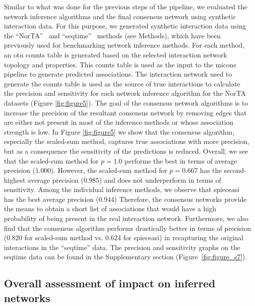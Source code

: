   Similar to what was done for the previous steps of the pipeline, we evaluated the network inference algorithms and the final consensus network using synthetic interaction data.
  For this purpose, we generated synthetic interaction data using the ``NorTA''~\cite{Kurtz2015} and ``seqtime''~\cite{faustSignaturesEcologicalProcesses2018} methods (see Methods), which have been previously used for benchmarking network inference methods.
  For each method, an \ac{otu} counts table is generated based on the selected interaction network topology and properties.
  This counts table is used as the input to the \ac{micone} pipeline to generate predicted associations.
  The interaction network used to generate the counts table is used as the source of true interactions to calculate the precision and sensitivity for each network inference algorithm for the NorTA datasets (Figure \ref{fig:figure5}).
  The goal of the consensus network algorithms is to increase the precision of the resultant consensus network by removing edges that are either not present in most of the inference methods or whose association strength is low.
  In Figure \ref{fig:figure5} we show that the consensus algorithm, especially the scaled-sum method, captures true associations with more precision, but as a consequence the sensitivity of the predictions is reduced.
  Overall, we see that the scaled-sum method for $p=1.0$ performs the best in terms of average precision ($1.000$).
  However, the scaled-sum method for $p=0.667$ has the second-highest average precision ($0.985$) and does not underperform in terms of sensitivity.
  Among the individual inference methods, we observe that \ac{spieceasi} has the best average precision ($0.944$)
  Therefore, the consensus networks provide the means to obtain a short list of associations that would have a high probability of being present in the real interaction network.
  Furthermore, we also find that the consensus algorithm performs drastically better in terms of precision (0.820 for scaled-sum method vs. 0.624 for \ac{spieceasi}) in recapturing the original interactions in the ``seqtime'' data.
  The precision and sensitivity graphs on the seqtime data can be found in the Supplementary section (Figure~\ref{fig:figure_s7}).

  \FloatBarrier

  \subsection*{Overall assessment of impact on inferred networks}

